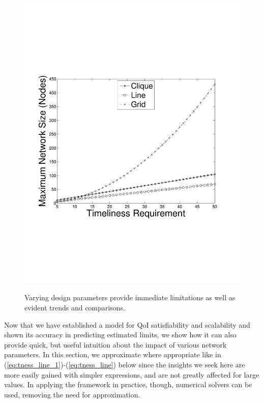 \begin{figure}
{	\includegraphics[scale=0.22, clip=true, trim=14mm 65mm 25mm 65mm]{num_nodes_vs_tness_5_SS_12_IS.pdf}
        \label{fig:use_case_num_nodes_vs_qoi_2}
        }

   \caption{Varying design parameters provide immediate limitations as well as evident trends and comparisons.}
   \label{fig:huh_net_design}
   \vspace{-5mm}
\end{figure}
 
Now that we have established a model for QoI satisfiability and scalability and shown its accuracy in predicting estimated limits, we show how it can also provide quick, but useful intuition about the impact of various network parameters.  In this section, we approximate where appropriate like in (\ref{eq:tness_line_1})-(\ref{eq:tness_line}) below since the insights we seek here are more easily gained with simpler expressions, and are not greatly affected for large values.  In applying the framework in practice, though, numerical solvers can be used, removing the need for approximation.    


